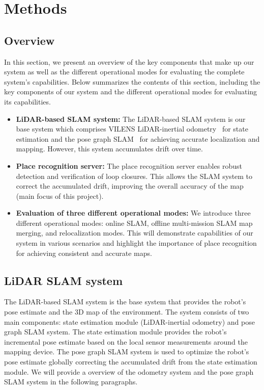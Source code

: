 \chapter{Methods}
\label{ch:methods}

\section{Overview}
\label{sec:overview}
In this section, we present an overview of the key components that make up our system as well as the different operational modes for evaluating the complete system's capabilities. Below summarizes the contents of this section, including the key components of our system and the different operational modes for evaluating its capabilities.
\begin{itemize}
  \item \textbf{LiDAR-based SLAM system:} The LiDAR-based SLAM system is our base system which comprises VILENS LiDAR-inertial odometry~\cite{wisth2023tro} for state estimation and the pose graph SLAM~\cite{proudman2022ras} for achieving accurate localization and mapping. However, this system accumulates drift over time.
  \item \textbf{Place recognition server:} The place recognition server enables robust detection and verification of loop closures. This allows the SLAM system to correct the accumulated drift, improving the overall accuracy of the map (main focus of this project).
 
  \item \textbf{Evaluation of three different operational modes:} We introduce three different operational modes: online SLAM, offline multi-mission SLAM map merging, and relocalization modes. This will demonstrate capabilities of our system in various scenarios and highlight the importance of place recognition for achieving consistent and accurate maps. 
\end{itemize}

\section{LiDAR SLAM system}
The LiDAR-based SLAM system is the base system that provides the robot's pose estimate and the 3D map of the environment. The system consists of two main components: state estimation module (LiDAR-inertial odometry) and pose graph SLAM system. The state estimation module provides the robot's incremental pose estimate based on the local sensor measurements around the mapping device. The pose graph SLAM system is used to optimize the robot's pose estimate globally correcting the accumulated drift from the state estimation module. We will provide a overview of the odometry system and the pose graph SLAM system in the following paragraphs. 
\vspace{6pt}

